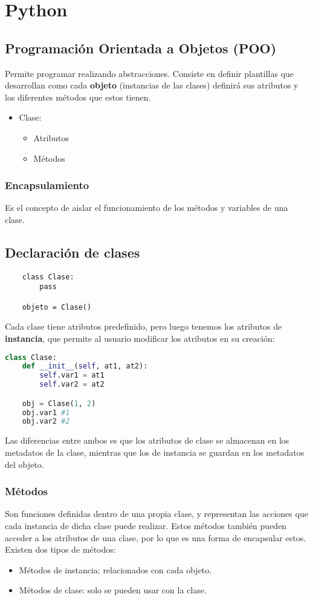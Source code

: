 \documentclass{./Programacion.tex}
\begin{document}
\chapter{Python}
\section{Programación Orientada a Objetos (POO)}
Permite programar realizando abstracciones. Consiste en definir plantillas que desarrollan como cada \textbf{objeto} (instancias de las clases) definirá sus atributos y los diferentes métodos que estos tienen.
\begin{itemize}
	\item Clase:
		\begin{itemize}
			\item Atributos
			\item Métodos
		\end{itemize}
\end{itemize}
\subsection{Encapsulamiento}
Es el concepto de aislar el funcionamiento de los métodos y variables de una clase.
\section{Declaración de clases}
\begin{lstlisting}
	class Clase:
		pass

	objeto = Clase()
\end{lstlisting}
Cada clase tiene atributos predefinido, pero luego tenemos los atributos de \textbf{instancia}, que permite al usuario modificar los atributos en su creación:
\begin{lstlisting}[language=python]
	class Clase:
	def __init__(self, at1, at2):
		self.var1 = at1
		self.var2 = at2

	obj = Clase(1, 2)
	obj.var1 #1
	obj.var2 #2
\end{lstlisting}
Las diferencias entre ambos es que los atributos de clase se almacenan en los metadatos de la clase, mientras que los de instancia se guardan en los metadatos del objeto.
\subsection{Métodos}
Son funciones definidas dentro de una propia clase, y representan las acciones que cada instancia de dicha clase puede realizar. Estos métodos también pueden acceder a los atributos de una clase, por lo que es una forma de encapsular estos.
Existen dos tipos de métodos:
\begin{itemize}
	\item Métodos de instancia: relacionados con cada objeto.
	\item Métodos de clase: solo se pueden usar con la clase.
\end{itemize}
\end{document}
